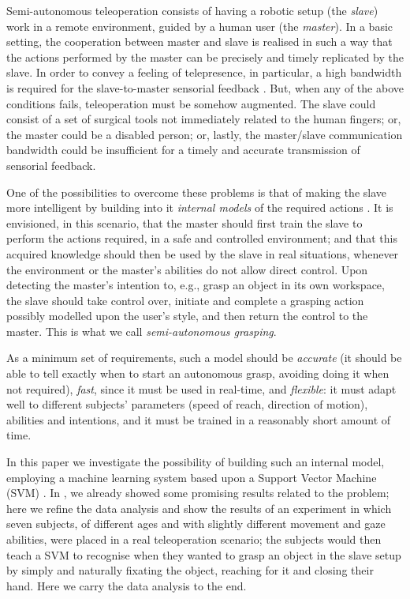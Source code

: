 Semi-autonomous teleoperation consists of having a robotic setup (the
\emph{slave}) work in a remote environment, guided by a human user
(the \emph{master}). In a basic setting, the cooperation between
master and slave is realised in such a way that the actions performed
by the master can be precisely and timely replicated by the slave. In
order to convey a feeling of telepresence, in particular, a high
bandwidth is required for the slave-to-master sensorial feedback
\cite{telesensation}. But, when any of the above conditions fails,
teleoperation must be somehow augmented. The slave could consist of a
set of surgical tools \cite{okamura} not immediately related to the
human fingers; or, the master could be a disabled person; or, lastly,
the master/slave communication bandwidth could be insufficient for a
timely and accurate transmission of sensorial feedback.

One of the possibilities to overcome these problems is that of making
the slave more intelligent by building into it \emph{internal models}
of the required actions \cite{kawato-99}. It is envisioned, in this
scenario, that the master should first train the slave to perform the
actions required, in a safe and controlled environment; and that this
acquired knowledge should then be used by the slave in real
situations, whenever the environment or the master's abilities do not
allow direct control. Upon detecting the master's intention to, e.g.,
grasp an object in its own workspace, the slave should take control
over, initiate and complete a grasping action possibly modelled upon
the user's style, and then return the control to the master. This is
what we call \emph{semi-autonomous grasping}.

As a minimum set of requirements, such a model should be
\emph{accurate} (it should be able to tell exactly when to start an
autonomous grasp, avoiding doing it when not required), \emph{fast},
since it must be used in real-time, and \emph{flexible}: it must adapt
well to different subjects' parameters (speed of reach, direction of
motion), abilities and intentions, and it must be trained in a
reasonably short amount of time.

In this paper we investigate the possibility of building such an
internal model, employing a machine learning system based upon a
Support Vector Machine (SVM) \cite{BGV92}. In \cite{clea07}, we
already showed some promising results related to the problem; here we
refine the data analysis and show the results of an experiment in
which seven subjects, of different ages and with slightly different
movement and gaze abilities, were placed in a real teleoperation
scenario; the subjects would then teach a SVM to recognise when they
wanted to grasp an object in the slave setup by simply and naturally
fixating the object, reaching for it and closing their hand. Here we
carry the data analysis to the end.

